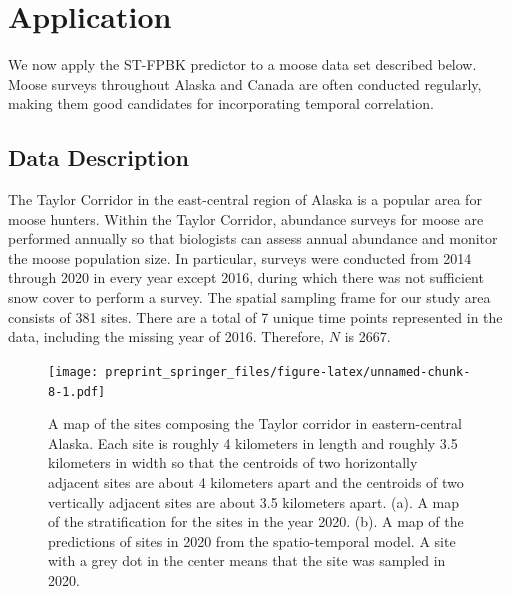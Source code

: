 \documentclass[smallextended]{svjour3}       %
\begin{document}
\hypertarget{section:Application}{%
\section{Application}\label{section:Application}}

We now apply the ST-FPBK predictor to a moose data set described below.
Moose surveys throughout Alaska and Canada are often conducted
regularly, making them good candidates for incorporating temporal
correlation.

\hypertarget{data-description}{%
\subsection{Data Description}\label{data-description}}

The Taylor Corridor in the east-central region of Alaska is a popular
area for moose hunters. Within the Taylor Corridor, abundance surveys
for moose are performed annually so that biologists can assess annual
abundance and monitor the moose population size. In particular, surveys
were conducted from 2014 through 2020 in every year except 2016, during
which there was not sufficient snow cover to perform a survey. The
spatial sampling frame for our study area consists of 381 sites. There
are a total of 7 unique time points represented in the data, including
the missing year of 2016. Therefore, \(N\) is 2667.

\begin{figure}
\centering
\texttt{[image: preprint\_springer\_files/figure-latex/unnamed-chunk-8-1.pdf]}
\caption{\label{fig:sitepredmap} A map of the sites composing the Taylor
corridor in eastern-central Alaska. Each site is roughly 4 kilometers in
length and roughly 3.5 kilometers in width so that the centroids of two
horizontally adjacent sites are about 4 kilometers apart and the
centroids of two vertically adjacent sites are about 3.5 kilometers
apart. (a). A map of the stratification for the sites in the year 2020.
(b). A map of the predictions of sites in 2020 from the spatio-temporal
model. A site with a grey dot in the center means that the site was
sampled in 2020.}
\end{figure}
\end{document}
